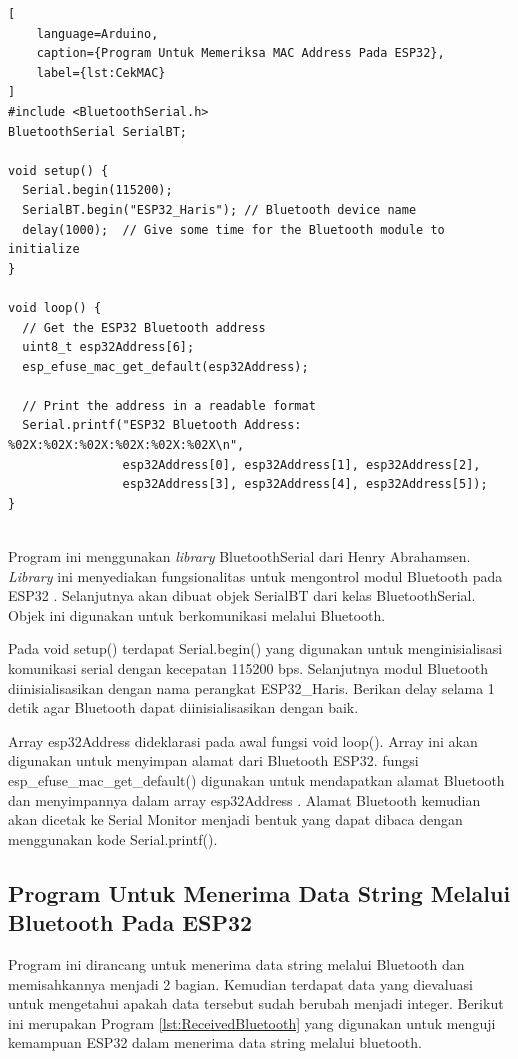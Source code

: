\begin{lstlisting}[
    language=Arduino,
    caption={Program Untuk Memeriksa MAC Address Pada ESP32},
    label={lst:CekMAC}
]
#include <BluetoothSerial.h>
BluetoothSerial SerialBT;

void setup() {
  Serial.begin(115200);
  SerialBT.begin("ESP32_Haris"); // Bluetooth device name
  delay(1000);  // Give some time for the Bluetooth module to initialize
}

void loop() {
  // Get the ESP32 Bluetooth address
  uint8_t esp32Address[6];
  esp_efuse_mac_get_default(esp32Address);

  // Print the address in a readable format
  Serial.printf("ESP32 Bluetooth Address: %02X:%02X:%02X:%02X:%02X:%02X\n",
                esp32Address[0], esp32Address[1], esp32Address[2],
                esp32Address[3], esp32Address[4], esp32Address[5]);
}
    
\end{lstlisting}

Program ini menggunakan \emph{library} BluetoothSerial dari Henry Abrahamsen. \emph{Library} ini menyediakan fungsionalitas untuk mengontrol modul Bluetooth pada ESP32 \parencite{Abrahamsen_2023}. Selanjutnya akan dibuat objek SerialBT dari kelas BluetoothSerial. Objek ini digunakan untuk berkomunikasi melalui Bluetooth. 

Pada void setup() terdapat Serial.begin() yang digunakan untuk menginisialisasi komunikasi serial dengan kecepatan 115200 bps. Selanjutnya modul Bluetooth diinisialisasikan dengan nama perangkat ESP32\_Haris. Berikan delay selama 1 detik agar Bluetooth dapat diinisialisasikan dengan baik.

Array esp32Address dideklarasi pada awal fungsi void loop(). Array ini akan digunakan untuk menyimpan alamat dari Bluetooth ESP32. fungsi esp\_efuse\_mac\_get\_default() digunakan untuk mendapatkan alamat Bluetooth dan menyimpannya dalam array esp32Address \parencite{Systems_2023}. Alamat Bluetooth kemudian akan dicetak ke Serial Monitor menjadi bentuk yang dapat dibaca dengan menggunakan kode Serial.printf(). 

\subsection{Program Untuk Menerima Data String Melalui Bluetooth Pada ESP32}

Program ini dirancang untuk menerima data string melalui Bluetooth dan memisahkannya menjadi 2 bagian. Kemudian terdapat data yang dievaluasi untuk mengetahui apakah data tersebut sudah berubah menjadi integer. Berikut ini merupakan Program \ref{lst:ReceivedBluetooth} yang digunakan untuk menguji kemampuan ESP32 dalam menerima data string melalui bluetooth.

